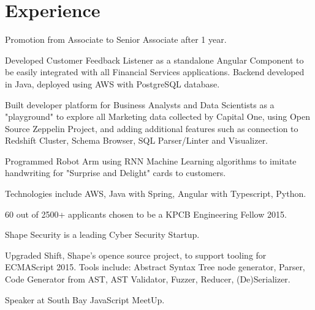 \documentclass[letterpaper]{deedy-resume} %
\begin{document}
\begin{minipage}[t]{0.66\textwidth} %


\section{Experience}


\vspace{\topsep} %
\begin{tightitemize}
\item Promotion from Associate to Senior Associate after 1 year.
\item Developed Customer Feedback Listener as a standalone Angular Component to be easily integrated with all Financial Services applications. Backend developed in Java, deployed using AWS with PostgreSQL database.
\item Built developer platform for Business Analysts and Data Scientists as a "playground" to explore all Marketing data collected by Capital One, using Open Source Zeppelin Project, and adding additional features such as connection to Redshift Cluster, Schema Browser, SQL Parser/Linter and Visualizer. 
\item Programmed Robot Arm using RNN Machine Learning algorithms to imitate handwriting for "Surprise and Delight" cards to customers. 
\item Technologies include AWS, Java with Spring, Angular with Typescript, Python.
\end{tightitemize}

\sectionspace %



\begin{tightitemize}
\item 60 out of 2500+ applicants chosen to be a KPCB Engineering Fellow 2015.
\item Shape Security is a leading Cyber Security Startup.
\item Upgraded Shift, Shape's opence source project, to support tooling for ECMAScript 2015. Tools include: Abstract Syntax Tree node generator, Parser, Code Generator from AST, AST Validator, Fuzzer, Reducer, (De)Serializer.
\item Speaker at South Bay JavaScript MeetUp.
\end{tightitemize}


\end{minipage}
\end{document}
